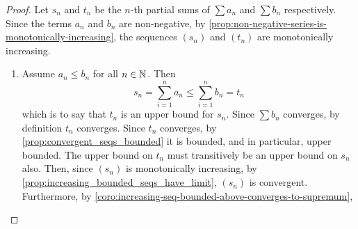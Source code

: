 \documentclass[../MathsNotesBase.tex]{subfiles}
\begin{document}
{		\nl[20]
		\bigskip
		\begin{proof}\nl
			Let $s_n$ and $t_n$ be the $n$-th partial sums of ${ \sum a_n }$ and ${ \sum b_n }$ respectively. Since the terms $a_n$ and $b_n$ are non-negative, by \autoref{prop:non-negative-series-is-monotonically-increasing}, the sequences $(s_n)$ and $(t_n)$ are monotonically increasing.
			\begin{enumerate}[label=(\roman*)]
				\item Assume ${ a_n \leq b_n }$ for all ${ n \in \mathbb{N}^{} }$. Then
					\[ s_n = \sum_{i=1}^n a_n \leq \sum_{i=1}^n b_n = t_n \]
					which is to say that $t_n$ is an upper bound for $s_n$. Since ${ \sum b_n }$ converges, by definition $t_n$ converges. Since $t_n$ converges, by \autoref{prop:convergent_seqs_bounded} it is bounded, and in particular, upper bounded. The upper bound on $t_n$ must transitively be an upper bound on $s_n$ also. Then, since $(s_n)$ is monotonically increasing, by \autoref{prop:increasing_bounded_seqs_have_limit}, $(s_n)$ is convergent. Furthermore, by \autoref{coro:increasing-seq-bounded-above-converges-to-supremum},

\end{enumerate}
\end{proof}}
\end{document}
